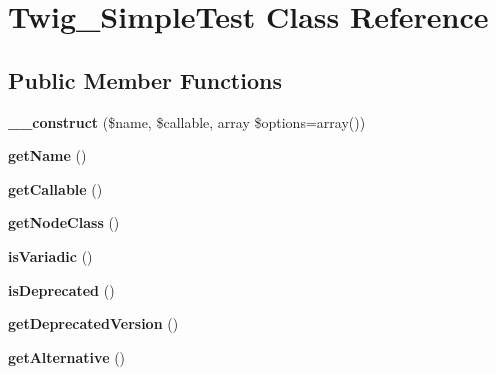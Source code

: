\hypertarget{classTwig__SimpleTest}{}\section{Twig\+\_\+\+Simple\+Test Class Reference}
\label{classTwig__SimpleTest}
\subsection*{Public Member Functions}
\begin{DoxyCompactItemize}
\item 
{\bfseries \+\_\+\+\_\+construct} (\$name, \$callable, array \$options=array())\hypertarget{classTwig__SimpleTest_a96838db521f863741dcd94b1903a1c74}{}\label{classTwig__SimpleTest_a96838db521f863741dcd94b1903a1c74}

\item 
{\bfseries get\+Name} ()\hypertarget{classTwig__SimpleTest_a89193fb0595773deab81e31d3305af36}{}\label{classTwig__SimpleTest_a89193fb0595773deab81e31d3305af36}

\item 
{\bfseries get\+Callable} ()\hypertarget{classTwig__SimpleTest_a304e94e1402675bd5b3d31358944df73}{}\label{classTwig__SimpleTest_a304e94e1402675bd5b3d31358944df73}

\item 
{\bfseries get\+Node\+Class} ()\hypertarget{classTwig__SimpleTest_a33cf20c48535a2cfdc116ef9d33a9496}{}\label{classTwig__SimpleTest_a33cf20c48535a2cfdc116ef9d33a9496}

\item 
{\bfseries is\+Variadic} ()\hypertarget{classTwig__SimpleTest_affba89ebc4d5a857edc9cb1045d23640}{}\label{classTwig__SimpleTest_affba89ebc4d5a857edc9cb1045d23640}

\item 
{\bfseries is\+Deprecated} ()\hypertarget{classTwig__SimpleTest_a3483782b70440f662404db572ff084d7}{}\label{classTwig__SimpleTest_a3483782b70440f662404db572ff084d7}

\item 
{\bfseries get\+Deprecated\+Version} ()\hypertarget{classTwig__SimpleTest_af087f069c488fb25e6f8238a1d7b37ac}{}\label{classTwig__SimpleTest_af087f069c488fb25e6f8238a1d7b37ac}

\item 
{\bfseries get\+Alternative} ()\hypertarget{classTwig__SimpleTest_a27cac2ff7975780c6f2f621929467599}{}\label{classTwig__SimpleTest_a27cac2ff7975780c6f2f621929467599}

\end{DoxyCompactItemize}
